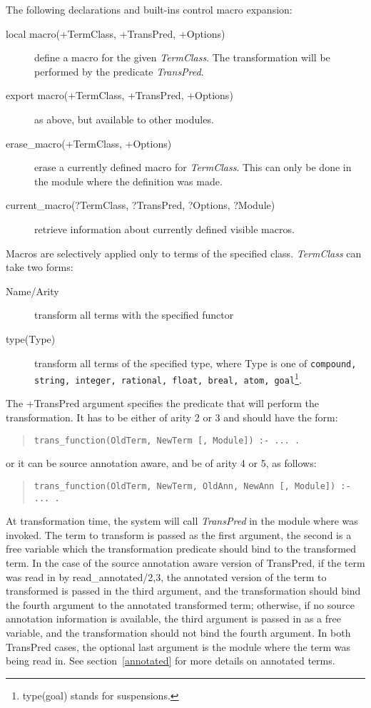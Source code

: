 The following declarations and built-ins control macro expansion:
\begin{description}
\item[local macro(+TermClass, +TransPred, +Options)]
define a macro for the given {\it TermClass}. The transformation will
be performed by the predicate {\it TransPred}.
\item[export macro(+TermClass, +TransPred, +Options)]
as above, but available to other modules.
\item[erase_macro(+TermClass, +Options)]
erase a currently defined macro for {\it TermClass}. This can only be done
in the module where the definition was made.
\item[current_macro(?TermClass, ?TransPred, ?Options, ?Module)]
retrieve information about currently defined visible macros.
\end{description}
Macros are selectively applied only to terms of the specified class.
{\it TermClass} can take two forms:
\begin{description}
\item[Name/Arity] transform all terms with the specified functor
\item[type(Type)] transform all terms of the specified type, where Type
is one of {\tt compound, string, integer, rational, float, breal, atom,
goal}\footnote{type(goal) stands for suspensions.}.
\end{description}
The {+TransPred} argument specifies the predicate that will perform the
transformation. It has to be either of arity 2 or 3 and should have the form:
\begin{quote}\begin{verbatim}
trans_function(OldTerm, NewTerm [, Module]) :- ... .
\end{verbatim}\end{quote}
or it can be source annotation aware, and be of arity 4 or 5, as follows:
\begin{quote}\begin{verbatim}
trans_function(OldTerm, NewTerm, OldAnn, NewAnn [, Module]) :- ... .
\end{verbatim}\end{quote}
At transformation time, the system will call {\it TransPred} in the module
where  was invoked.
The term to transform is passed as the first argument, the second is a free
variable which the transformation predicate should bind to the transformed
term. In the case of the source annotation aware version of TransPred, if
the term was read in by read_annotated/2,3, the annotated version of the
term to transformed is passed in the third argument, and the transformation
should bind the fourth argument to the annotated transformed term;
otherwise, if no source annotation information is available, the third
argument is passed in as a free variable, and the transformation should not
bind the fourth argument. In both TransPred cases, the optional last
argument is the module where the term was being read in. See
section~\ref{annotated} for more details on annotated terms.


